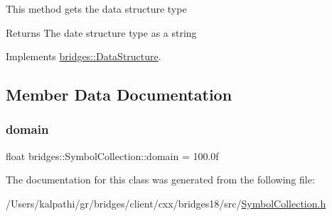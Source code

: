 This method gets the data structure type

\begin{DoxyReturn}{Returns}
The date structure type as a string 
\end{DoxyReturn}


Implements \mbox{\hyperlink{classbridges_1_1_data_structure_a957a63b106e340bc753620c650632bdc}{bridges\+::\+Data\+Structure}}.



\subsection{Member Data Documentation}
\mbox{\label{classbridges_1_1_symbol_collection_a9387df86c54863524ab4779ff8458c7a}} 
\subsubsection{\texorpdfstring{domain}{domain}}
{\footnotesize\ttfamily float bridges\+::\+Symbol\+Collection\+::domain = 100.\+0f\hspace{0.3cm}{\ttfamily [protected]}}



The documentation for this class was generated from the following file\+:\begin{DoxyCompactItemize}
\item 
/\+Users/kalpathi/gr/bridges/client/cxx/bridges18/src/\mbox{\hyperlink{_symbol_collection_8h}{Symbol\+Collection.\+h}}\end{DoxyCompactItemize}

